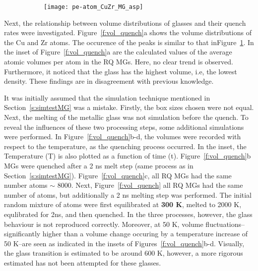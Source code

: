 \begin{figure}[!ht]
	\centering
	\begin{subfigure}{\linewidth} \centering
		\texttt{[image: pe-atom\_CuZr\_MG\_asp]}
	\end{subfigure}%

	\label{f:vol_comp}
\end{figure}

Next, the relationship between volume distributions of \cz glasses and their quench rates were investigated. Figure~\ref{f:vol_quench}a shows the volume distributions of the Cu and Zr atoms. The occurence of the peaks is similar to that inFigure~\ref{f:vol_comp}. In the inset of Figure~\ref{f:vol_quench}a are the calculated values of the average atomic volumes per atom in the RQ MGs. Here, no clear trend is observed. Furthermore, it noticed that the  glass has the highest volume, i.e, the lowest density. These findings are in disagreement with previous knowledge. \par

It was initially assumed that the simulation technique mentioned in Section~\ref{s:simtestMG} was a mistake. Firstly, the box sizes chosen were not equal. Next, the melting of the metallic glass was not simulation before the quench. To reveal the influences of these two processing steps, some additional simulations were performed. In Figure~\ref{f:vol_quench}b-d, the volumes were recorded with respect to the temperature, as the quenching process occurred. In the inset, the Temperature (T) is also plotted as a function of time (t). Figure~\ref{f:vol_quench}b MGs were quenched after a 2 ns melt step (same process as in Section~\ref{s:simtestMG}). Figure~\ref{f:vol_quench}c, all RQ MGs had the same number atoms $\sim$ 8000. Next, Figure~\ref{f:vol_quench} all RQ MGs had the same number of atoms, but additionally a 2 ns melting step was performed. The initial random mixture of atoms were first equilibrated at \textbf{300 K}, melted to 2000 K, equlibrated for 2ns, and then quenched. In the three processes, however, the glass behaviour is not reproduced correctly. Moreover, at 50 K, volume fluctuations--significantly higher than a volume change occuring by a temperature increase of 50 K--are seen as indicated in the insets of Figures~\ref{f:vol_quench}b-d. Visually, the glass transition is estimated to be around 600 K, however, a more rigorous estimated has not been attempted for these glasses. \par


